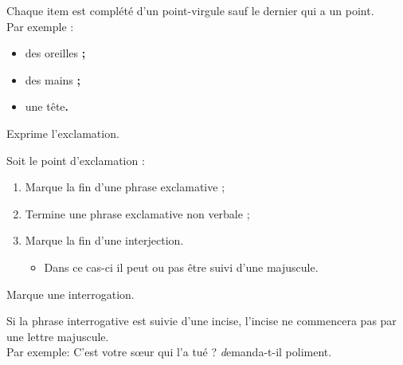 \documentclass[10pt, french]{article}
\begin{document}
\begin{multicols*}{2}
\begin{astuces}
Chaque item est complété d'un point-virgule sauf le dernier qui a un point.\\

Par exemple :
\begin{itemize}
	\item	des oreilles \textbf{;}
	\item	des mains \textbf{;}
	\item	une tête\textbf{.}
\end{itemize}
\end{astuces}

\begin{definitionNOHFILLprop}
Exprime l'exclamation.

Soit le point d'exclamation : 
\begin{enumerate}
	\item	Marque la fin d'une phrase exclamative ;
	\item	Termine une phrase exclamative non verbale ;
	\item	Marque la fin d'une interjection.
		\begin{itemize}
		\item	Dans ce cas-ci il peut ou pas être suivi d'une majuscule.
		\end{itemize}
\end{enumerate}
\end{definitionNOHFILLprop}

\begin{definitionNOHFILLprop}
Marque une interrogation.

\begin{astuces}
Si la phrase interrogative est suivie d'une incise, l'incise ne commencera pas par une lettre majuscule.	\\

Par exemple: C'est votre sœur qui l'a tué ? \textit{d}emanda-t-il poliment.
\end{astuces}
\end{definitionNOHFILLprop}


\end{multicols*}
\end{document}
